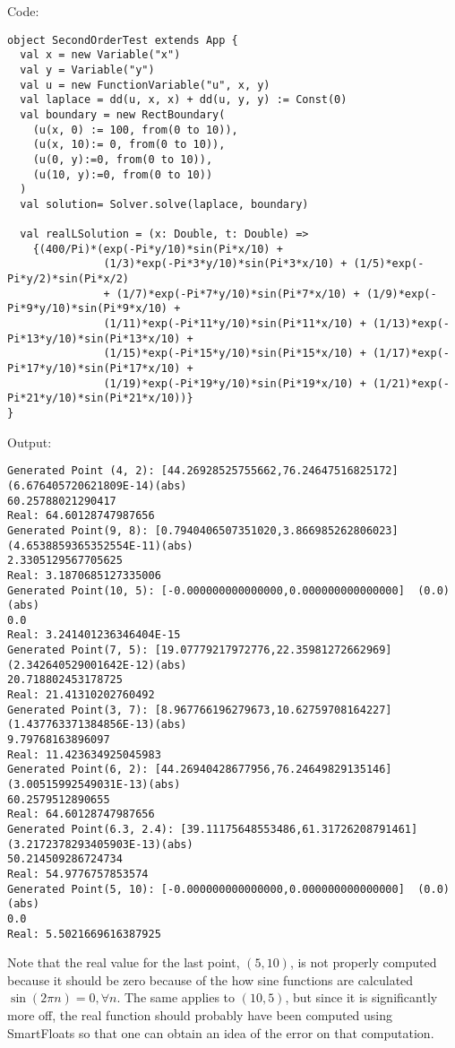 \noindent Code:
\begingroup
\fontsize{10pt}{12pt}
\begin{verbatim}
object SecondOrderTest extends App {
  val x = new Variable("x")
  val y = Variable("y")
  val u = new FunctionVariable("u", x, y)
  val laplace = dd(u, x, x) + dd(u, y, y) := Const(0)
  val boundary = new RectBoundary(
    (u(x, 0) := 100, from(0 to 10)),
    (u(x, 10):= 0, from(0 to 10)),
    (u(0, y):=0, from(0 to 10)),
    (u(10, y):=0, from(0 to 10))
  )
  val solution= Solver.solve(laplace, boundary)

  val realLSolution = (x: Double, t: Double) =>
    {(400/Pi)*(exp(-Pi*y/10)*sin(Pi*x/10) +
               (1/3)*exp(-Pi*3*y/10)*sin(Pi*3*x/10) + (1/5)*exp(-Pi*y/2)*sin(Pi*x/2)
               + (1/7)*exp(-Pi*7*y/10)*sin(Pi*7*x/10) + (1/9)*exp(-Pi*9*y/10)*sin(Pi*9*x/10) +
               (1/11)*exp(-Pi*11*y/10)*sin(Pi*11*x/10) + (1/13)*exp(-Pi*13*y/10)*sin(Pi*13*x/10) +
               (1/15)*exp(-Pi*15*y/10)*sin(Pi*15*x/10) + (1/17)*exp(-Pi*17*y/10)*sin(Pi*17*x/10) +
               (1/19)*exp(-Pi*19*y/10)*sin(Pi*19*x/10) + (1/21)*exp(-Pi*21*y/10)*sin(Pi*21*x/10))}
}
\end{verbatim}
\endgroup
\noindent Output:
\begingroup
\fontsize{10pt}{12pt}
\begin{verbatim}
Generated Point (4, 2): [44.26928525755662,76.24647516825172]  (6.676405720621809E-14)(abs)
60.25788021290417
Real: 64.60128747987656
Generated Point(9, 8): [0.7940406507351020,3.866985262806023]  (4.6538859365352554E-11)(abs)
2.3305129567705625
Real: 3.1870685127335006
Generated Point(10, 5): [-0.000000000000000,0.000000000000000]  (0.0)(abs)
0.0
Real: 3.241401236346404E-15
Generated Point(7, 5): [19.07779217972776,22.35981272662969]  (2.342640529001642E-12)(abs)
20.718802453178725
Real: 21.41310202760492
Generated Point(3, 7): [8.967766196279673,10.62759708164227]  (1.437763371384856E-13)(abs)
9.79768163896097
Real: 11.423634925045983
Generated Point(6, 2): [44.26940428677956,76.24649829135146]  (3.00515992549031E-13)(abs)
60.2579512890655
Real: 64.60128747987656
Generated Point(6.3, 2.4): [39.11175648553486,61.31726208791461]  (3.2172378293405903E-13)(abs)
50.214509286724734
Real: 54.9776757853574
Generated Point(5, 10): [-0.000000000000000,0.000000000000000]  (0.0)(abs)
0.0
Real: 5.5021669616387925
\end{verbatim}
\endgroup

Note that the real value for the last point, $(5, 10)$, is not
properly computed because it should be zero because of the how sine
functions are calculated $\sin(2\pi n) = 0,
\forall n$. The same applies to $(10, 5)$, but since it is
significantly  more off, the real function should
probably have been computed using SmartFloats so that one can obtain
an idea of the error on that computation.
